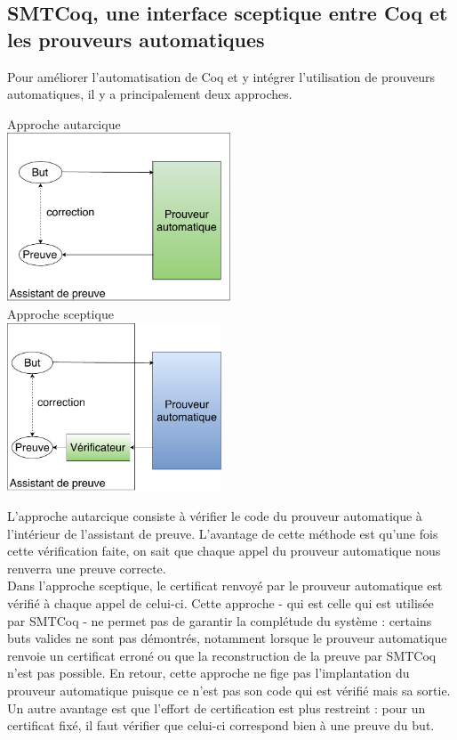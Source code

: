 \documentclass[11pt]{article}
\begin{document}
\subsection{SMTCoq, une interface sceptique entre Coq et les prouveurs automatiques}\label{sceptique_autarcique}

Pour améliorer l'automatisation de Coq et y intégrer l'utilisation de prouveurs automatiques, il y a principalement deux approches.

\begin{multicols}{2}
\begin{center}
Approche autarcique\\
\includegraphics[height=5cm]{1_Autarcique.pdf}\\
Approche sceptique\\
\includegraphics[height=5cm]{2_Sceptique.pdf}\\

\end{center}
\end{multicols}

L'approche autarcique consiste à vérifier le code du prouveur automatique à l'intérieur de l'assistant de preuve. L'avantage de cette méthode est qu'une fois cette vérification faite, on sait que chaque appel du prouveur automatique nous renverra une preuve correcte. \\

Dans l'approche sceptique, le certificat renvoyé par le prouveur automatique est vérifié à chaque appel de celui-ci. Cette approche - qui est celle qui est utilisée par SMTCoq - ne permet pas de garantir la complétude du système : certains buts valides ne sont pas démontrés, notamment lorsque le prouveur automatique renvoie un certificat erroné ou que la reconstruction de la preuve par SMTCoq n'est pas possible. En retour, cette approche ne fige pas l'implantation du prouveur automatique puisque ce n'est pas son code qui est vérifié mais sa sortie. Un autre avantage est que l'effort de certification est plus restreint : pour un certificat fixé, il faut vérifier que celui-ci correspond bien à une preuve du but.
\end{document}
